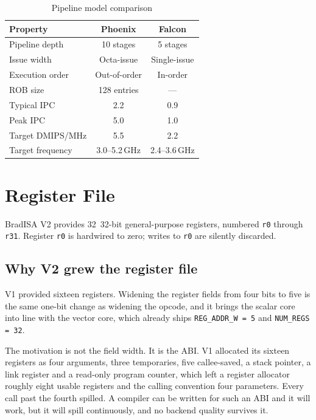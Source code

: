\documentclass[11pt,a4paper]{article}
\begin{document}
\begin{table}[htbp]
\centering
\caption{Pipeline model comparison}
\begin{tabular}{lcc}
\toprule
Property               & Phoenix            & Falcon           \\
\midrule
Pipeline depth         & 10 stages          & 5 stages         \\
Issue width            & Octa-issue         & Single-issue     \\
Execution order        & Out-of-order       & In-order         \\
ROB size              & 128 entries         & ---              \\
Typical IPC           & 2.2                & 0.9              \\
Peak IPC              & 5.0                & 1.0              \\
Target DMIPS/MHz      & 5.5                & 2.2              \\
Target frequency      & 3.0--5.2\,GHz      & 2.4--3.6\,GHz    \\
\bottomrule
\end{tabular}
\end{table}

\newpage

\section{Register File}

BradISA V2 provides 32~32-bit general-purpose registers, numbered {\tt r0}
through {\tt r31}. Register {\tt r0} is hardwired to zero; writes to {\tt r0}
are silently discarded.

\subsection{Why V2 grew the register file}

V1 provided sixteen registers. Widening the register fields from four bits to
five is the same one-bit change as widening the opcode, and it brings the
scalar core into line with the vector core, which already ships
\texttt{REG\_ADDR\_W = 5} and \texttt{NUM\_REGS = 32}.

The motivation is not the field width. It is the ABI. V1 allocated its sixteen
registers as four arguments, three temporaries, five callee-saved, a stack
pointer, a link register and a read-only program counter, which left a register
allocator roughly eight usable registers and the calling convention four
parameters. Every call past the fourth spilled. A compiler can be written for
such an ABI and it will work, but it will spill continuously, and no backend
quality survives it.
\end{document}
